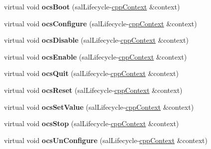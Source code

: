 \begin{DoxyCompactItemize}
\item 
\hypertarget{classsal_lifecycle_state_a9ab926e0208ddb776b012647a4f63438}{virtual void {\bfseries ocs\-Boot} (sal\-Lifecycle-\/\hyperlink{classcpp_context}{cpp\-Context} \&context)}\label{classsal_lifecycle_state_a9ab926e0208ddb776b012647a4f63438}

\item 
\hypertarget{classsal_lifecycle_state_a5567e67a9924d644e1a5e7ecd2e510ba}{virtual void {\bfseries ocs\-Configure} (sal\-Lifecycle-\/\hyperlink{classcpp_context}{cpp\-Context} \&context)}\label{classsal_lifecycle_state_a5567e67a9924d644e1a5e7ecd2e510ba}

\item 
\hypertarget{classsal_lifecycle_state_a057a54af03f171a32c609c27873c9621}{virtual void {\bfseries ocs\-Disable} (sal\-Lifecycle-\/\hyperlink{classcpp_context}{cpp\-Context} \&context)}\label{classsal_lifecycle_state_a057a54af03f171a32c609c27873c9621}

\item 
\hypertarget{classsal_lifecycle_state_a2e3a3ee7c4ae90d667a760c695b1ee79}{virtual void {\bfseries ocs\-Enable} (sal\-Lifecycle-\/\hyperlink{classcpp_context}{cpp\-Context} \&context)}\label{classsal_lifecycle_state_a2e3a3ee7c4ae90d667a760c695b1ee79}

\item 
\hypertarget{classsal_lifecycle_state_a23a3d21ddc47a3613392c479f25dde9e}{virtual void {\bfseries ocs\-Quit} (sal\-Lifecycle-\/\hyperlink{classcpp_context}{cpp\-Context} \&context)}\label{classsal_lifecycle_state_a23a3d21ddc47a3613392c479f25dde9e}

\item 
\hypertarget{classsal_lifecycle_state_aefad5dda230a21380d5a6557109b8c53}{virtual void {\bfseries ocs\-Reset} (sal\-Lifecycle-\/\hyperlink{classcpp_context}{cpp\-Context} \&context)}\label{classsal_lifecycle_state_aefad5dda230a21380d5a6557109b8c53}

\item 
\hypertarget{classsal_lifecycle_state_a9b6e16ab531778811762f52caa1954a8}{virtual void {\bfseries ocs\-Set\-Value} (sal\-Lifecycle-\/\hyperlink{classcpp_context}{cpp\-Context} \&context)}\label{classsal_lifecycle_state_a9b6e16ab531778811762f52caa1954a8}

\item 
\hypertarget{classsal_lifecycle_state_ac696e1695290bf25509a2a00109f79ff}{virtual void {\bfseries ocs\-Stop} (sal\-Lifecycle-\/\hyperlink{classcpp_context}{cpp\-Context} \&context)}\label{classsal_lifecycle_state_ac696e1695290bf25509a2a00109f79ff}

\item 
\hypertarget{classsal_lifecycle_state_ae1fad2410fc68567391b866bcf6844ad}{virtual void {\bfseries ocs\-Un\-Configure} (sal\-Lifecycle-\/\hyperlink{classcpp_context}{cpp\-Context} \&context)}\label{classsal_lifecycle_state_ae1fad2410fc68567391b866bcf6844ad}

\end{DoxyCompactItemize}
